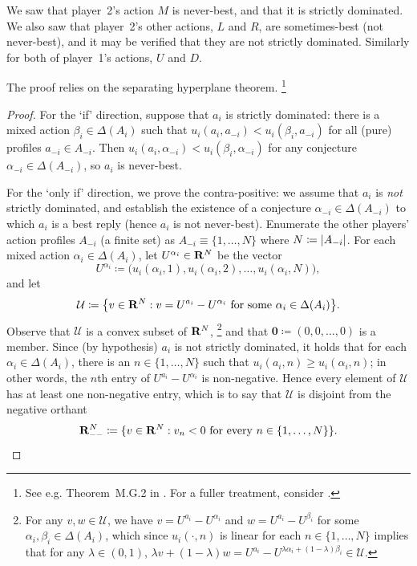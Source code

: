 \addtocounter{example}{-2}
\begin{example}[continued]
	\label{example:rbty_neverbest_pearce}
	We saw that player~2's action $M$ is never-best, and that it is strictly dominated. We also saw that player~2's other actions, $L$ and $R$, are sometimes-best (not never-best), and it may be verified that they are not strictly dominated. Similarly for both of player~1's actions, $U$ and $D$.
\end{example}
\addtocounter{example}{1}

The proof relies on the separating hyperplane theorem.%
	\footnote{See e.g. Theorem~M.G.2 in \textcite[][p.~948]{MascolellWhinstonGreen1995}. For a fuller treatment, consider \textcite{Border2016}.}

\begin{proof}
	For the `if' direction, suppose that $a_i$ is strictly dominated: there is a mixed action $\beta_i \in \Delta(A_i)$ such that $u_i(a_i,a_{-i}) < u_i(\beta_i,a_{-i})$ for all (pure) profiles $a_{-i} \in A_{-i}$. Then $u_i(a_i,\alpha_{-i}) < u_i(\beta_i,\alpha_{-i})$ for any conjecture $\alpha_{-i} \in \Delta(A_{-i})$, so $a_i$ is never-best.

	For the `only if' direction, we prove the contra-positive: we assume that $a_i$ is \emph{not} strictly dominated, and establish the existence of a conjecture $\alpha_{-i} \in \Delta(A_{-i})$ to which $a_i$ is a best reply (hence $a_i$ is not never-best). Enumerate the other players' action profiles $A_{-i}$ (a finite set) as $A_{-i} \equiv \{1,\dots,N\}$ where $N \coloneqq \abs*{A_{-i}}$. For each mixed action $\alpha_i \in \Delta(A_i)$, let $U^{\alpha_i} \in \mathbf{R}^N$ be the vector 
	\begin{equation*}
		U^{\alpha_i} \coloneqq \bigl( u_i(\alpha_i,1), u_i(\alpha_i,2), \dots, u_i(\alpha_i,N) \bigr) ,
	\end{equation*}
	and let
	\begin{equation*}
		\mathcal{U} \coloneqq \left\{ v \in \R^N : \text{$v = U^{a_i} - U^{\alpha_i}$ for some $\alpha_i \in \Delta(A_i)$} \right\} .
	\end{equation*}
	Observe that $\mathcal{U}$ is a convex subset of $\mathbf{R}^N$,%
		\footnote{For any $v,w \in \mathcal{U}$, we have $v = U^{a_i} - U^{\alpha_i}$ and $w = U^{a_i} - U^{\beta_i}$ for some $\alpha_i,\beta_i \in \Delta(A_i)$, which since $u_i(\cdot,n)$ is linear for each $n \in \{1,\dots,N\}$ implies that for any $\lambda \in (0,1)$, $\lambda v + (1-\lambda) w = U^{a_i} - U^{\lambda \alpha_i + (1-\lambda) \beta_i} \in \mathcal{U}$.}
	and that $\boldsymbol{0} \coloneqq (0,0,\dots,0)$ is a member.
	Since (by hypothesis) $a_i$ is not strictly dominated, it holds that for each $\alpha_i \in \Delta(A_i)$, there is an $n \in \{1,\dots,N\}$ such that $u_i(a_i,n) \geq u_i(\alpha_i,n)$; in other words, the $n$th entry of $U^{a_i}-U^{\alpha_i}$ is non-negative. Hence every element of $\mathcal{U}$ has at least one non-negative entry, which is to say that $\mathcal{U}$ is disjoint from the negative orthant
	\begin{equation*}
		\mathbf{R}_{--}^N \coloneqq \{ v \in \mathbf{R}^N : \text{$v_n < 0$ for every $n \in \{1,\dots,N\}$} \} .
	\end{equation*}


\end{proof}
